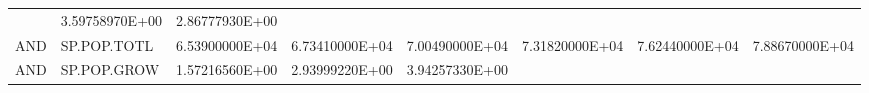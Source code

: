 \documentclass[]{article}
\begin{document}
\begin{longtable}[]{@{}llrrrrrr@{}}
\begin{minipage}[t]{0.11\columnwidth}
\end{minipage} & \begin{minipage}[t]{0.11\columnwidth}\raggedleft\strut
3.59758970E+00\strut
\end{minipage} & \begin{minipage}[t]{0.11\columnwidth}\raggedleft\strut
2.86777930E+00\strut
\end{minipage}\tabularnewline
\begin{minipage}[t]{0.06\columnwidth}\raggedright\strut
AND\strut
\end{minipage} & \begin{minipage}[t]{0.08\columnwidth}\raggedright\strut
SP.POP.TOTL\strut
\end{minipage} & \begin{minipage}[t]{0.11\columnwidth}\raggedleft\strut
6.53900000E+04\strut
\end{minipage} & \begin{minipage}[t]{0.11\columnwidth}\raggedleft\strut
6.73410000E+04\strut
\end{minipage} & \begin{minipage}[t]{0.11\columnwidth}\raggedleft\strut
7.00490000E+04\strut
\end{minipage} & \begin{minipage}[t]{0.11\columnwidth}\raggedleft\strut
7.31820000E+04\strut
\end{minipage} & \begin{minipage}[t]{0.11\columnwidth}\raggedleft\strut
7.62440000E+04\strut
\end{minipage} & \begin{minipage}[t]{0.11\columnwidth}\raggedleft\strut
7.88670000E+04\strut
\end{minipage}\tabularnewline
\begin{minipage}[t]{0.06\columnwidth}\raggedright\strut
AND\strut
\end{minipage} & \begin{minipage}[t]{0.08\columnwidth}\raggedright\strut
SP.POP.GROW\strut
\end{minipage} & \begin{minipage}[t]{0.11\columnwidth}\raggedleft\strut
1.57216560E+00\strut
\end{minipage} & \begin{minipage}[t]{0.11\columnwidth}\raggedleft\strut
2.93999220E+00\strut
\end{minipage} & \begin{minipage}[t]{0.11\columnwidth}\raggedleft\strut
3.94257330E+00\strut
\end{minipage} & \begin{minipage}[t]{0.11\columnwidth}\raggedleft\strut

\end{minipage}
\end{longtable}
\end{document}
